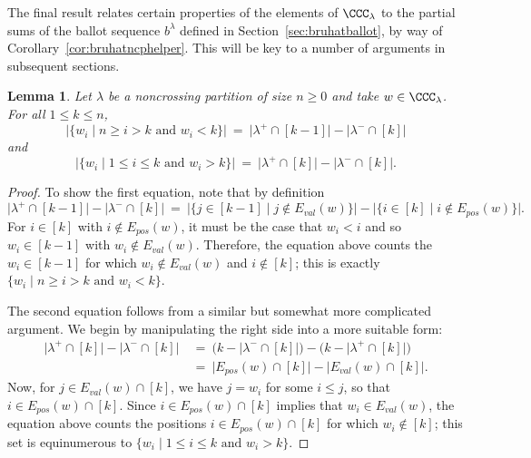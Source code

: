 \documentclass[12pt]{amsart}
\newtheorem{lem}[equation]{Lemma}
\theoremstyle{definition}
\theoremstyle{remark}
\numberwithin{equation}{section}
\renewcommand{\setminus}{-}
\newcommand{\EP}{E_{pos}}
\newcommand{\EV}{E_{val}}
\begin{document}
The final result relates certain properties of the elements of $\CCC_{\lambda}$ to the partial sums of the ballot sequence $b^{\lambda}$ defined in Section~\ref{sec:bruhatballot}, by way of Corollary~\ref{cor:bruhatncphelper}.  This will be key to a number of arguments in subsequent sections.


\begin{lem}
\label{lem:tableautobruhat}
Let $\lambda$ be a noncrossing partition of size $n \ge 0$ and take $w \in \CCC_{\lambda}$.  For all $1 \le k \le n$, 
\[
\big|\{ w_{i} \;|\; \text{$n \ge i > k$ and $w_{i} < k$}\}\big|
\ = \ \big|\lambda^{+} \cap [k-1]\big| - \big|\lambda^{-} \cap [k]\big|
\]
and 
\[
\big|\{ w_{i} \;|\; \text{$1 \le i \le k$ and $w_{i} > k$}\}\big|
\ =\  \big|\lambda^{+} \cap [k]\big| - \big|\lambda^{-} \cap [k]\big|.
\]
\end{lem}
\begin{proof}
To show the first equation, note that by definition
\[
\big|\lambda^{+} \cap [k-1]\big| - \big|\lambda^{-} \cap [k]\big| \ = \ \Big|\big\{j \in [k-1] \;|\; j \notin \EV(w)\big\}\Big| - \Big|\big\{i \in [k] \;|\; i \notin \EP(w)\big\}\Big|.
\]
For $i \in [k]$ with $i \notin \EP(w)$, it must be the case that $w_{i} < i$ and so $w_{i} \in [k-1]$ with $w_{i} \notin \EV(w)$.  
Therefore, the equation above counts the $w_{i} \in [k-1]$ for which $w_{i} \notin \EV(w)$ and $i \notin [k]$; this is exactly $\{ w_{i} \;|\; \text{$n \ge i > k$ and $w_{i} < k$}\}$.

The second equation follows from a similar but somewhat more complicated argument.  We begin by manipulating the right side into a more suitable form:
\begin{align*}
\big|\lambda^{+} \cap [k]\big| - \big|\lambda^{-} \cap [k] \big| \ &= \  \Big(k - \big|\lambda^{-} \cap [k] \big|\Big) - \Big(k - \big|\lambda^{+} \cap [k]\big|\Big) \\
&=\  \big|\EP(w) \cap [k]\big| - \big|\EV(w) \cap [k]\big|.
\end{align*}
Now, for $j \in \EV(w) \cap [k]$, we have $j = w_{i}$ for some $i \le j$, so that $i \in \EP(w) \cap [k]$.  Since $i \in \EP(w) \cap [k]$ implies that $w_{i} \in \EV(w)$, the equation above counts the positions $i \in \EP(w) \cap [k]$ for which $w_{i} \notin [k]$; this set is equinumerous to $\{ w_{i} \;|\; \text{$1 \le i \le k$ and $w_{i} > k$}\}$.
\end{proof}


\end{document}
